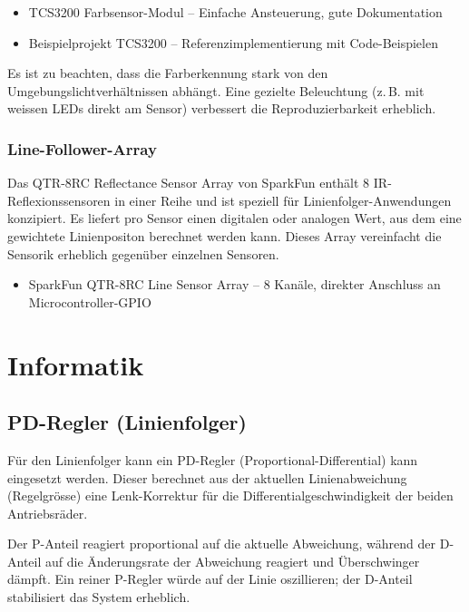 \documentclass[12pt,a4paper]{article}
\begin{document}
	\begin{itemize}
		\item TCS3200 Farbsensor-Modul \cite{berrybase_tcs3200} -- Einfache Ansteuerung, gute Dokumentation
		\item Beispielprojekt TCS3200 \cite{turanis_tcs3200} -- Referenzimplementierung mit Code-Beispielen
	\end{itemize}
	
	Es ist zu beachten, dass die Farberkennung stark von den Umgebungslichtverhältnissen abhängt. Eine gezielte Beleuchtung (z.\,B. mit weissen LEDs direkt am Sensor) verbessert die Reproduzierbarkeit erheblich.
	
	\subsubsection{Line-Follower-Array}
	
	Das QTR-8RC Reflectance Sensor Array von SparkFun enthält 8 IR-Reflexionssensoren in einer Reihe und ist speziell für Linienfolger-Anwendungen konzipiert. Es liefert pro Sensor einen digitalen oder analogen Wert, aus dem eine gewichtete Linienpositon berechnet werden kann. Dieses Array vereinfacht die Sensorik erheblich gegenüber einzelnen Sensoren.
	
	\begin{itemize}
		\item SparkFun QTR-8RC Line Sensor Array \cite{sparkfun_linesensor} -- 8 Kanäle, direkter Anschluss an Microcontroller-GPIO
	\end{itemize}
	
	\section{Informatik}
	
	\subsection{PD-Regler (Linienfolger)}
	
	Für den Linienfolger kann ein PD-Regler (Proportional-Differential) kann eingesetzt werden. Dieser berechnet aus der aktuellen Linienabweichung (Regelgrösse) eine Lenk-Korrektur für die Differentialgeschwindigkeit der beiden Antriebsräder.
	
	Der P-Anteil reagiert proportional auf die aktuelle Abweichung, während der D-Anteil auf die Änderungsrate der Abweichung reagiert und Überschwinger dämpft. Ein reiner P-Regler würde auf der Linie oszillieren; der D-Anteil stabilisiert das System erheblich.
	
\end{document}
